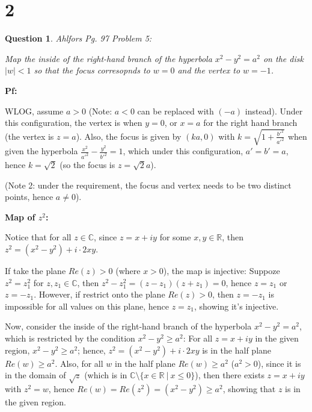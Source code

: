 \documentclass{article}
\newtheorem{question}{Question}
\begin{document}
\break

\section*{2}
\begin{myBox}[]{}
    \begin{question}
        Ahlfors Pg. 97 Problem 5:

        Map the inside of the right-hand branch of the hyperbola $x^2-y^2=a^2$ on the disk $|w|<1$
        so that the focus corresopnds to $w=0$ and the vertex to $w=-1$.
    \end{question}
\end{myBox}

\textbf{Pf:}

WLOG, assume $a>0$ (Note: $a<0$ can be replaced with $(-a)$ instead). Under this configuration, the vertex is when $y=0$, or $x=a$ for the right hand branch (the vertex is $z=a$).
Also, the focus is given by $(ka,0)$ with $k=\sqrt{1+\frac{b'^2}{a'^2}}$ when given the hyperbola $\frac{x^2}{a'^2}-\frac{y^2}{b'^2}=1$,
which under this configuration, $a'=b'=a$, hence $k=\sqrt{2}$ (so the focus is $z=\sqrt{2}a$).

(Note 2: under the requirement, the focus and vertex needs to be two distinct points, hence $a\neq 0$).

\hfill

\textbf{Map of $z^2$:}

Notice that for all $z\in\mathbb{C}$, since $z=x+iy$ for some $x,y\in\mathbb{R}$, then $z^2=(x^2-y^2)+i\cdot 2xy$.

If take the plane $Re(z)>0$ (where $x>0$), the map is injective: Suppoze $z^2=z_1^2$ for $z,z_1\in\mathbb{C}$, 
then $z^2-z_1^2=(z-z_1)(z+z_1)=0$, hence $z=z_1$ or $z=-z_1$. However, if restrict onto the plane $Re(z)>0$, then $z=-z_1$ is impossible for all values on this plane, hence $z=z_1$, showing it's injective.

\hfill

Now, consider the inside of the right-hand branch of the hyperbola $x^2-y^2=a^2$, which is restricted by the condition $x^2-y^2\geq a^2$:
For all $z=x+iy$ in the given region, $x^2-y^2\geq a^2$; hence, $z^2=(x^2-y^2)+i\cdot 2xy$ is in the half plane $Re(w)\geq a^2$.
Also, for all $w$ in the half plane $Re(w)\geq a^2$ ($a^2>0$), since it is in the domain of $\sqrt{z}$ (which is in $\mathbb{C}\setminus\{x\in\mathbb{R}\ |\ x\leq 0\}$),
then there exists $z=x+iy$ with $z^2=w$, hence $Re(w)=Re(z^2)=(x^2-y^2)\geq a^2$, showing that $z$ is in the given region.
\end{document}
